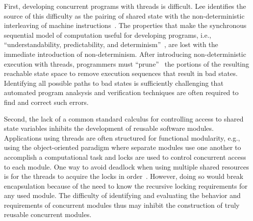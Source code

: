 First, developing concurrent programs with threads is difficult.
Lee identifies the source of this difficulty as the pairing of shared state with the non-deterministic interleaving of machine instructions~\cite{lee2006problem}.
The properties that make the synchronous sequential model of computation useful for developing programs, i.e., ``understandability, predictability, and determinism''~\cite{lee2006problem}, are lost with the immediate introduction of non-determinism.
After introducing non-deterministic execution with threads, programmers must ``prune''~\cite{lee2006problem} the portions of the resulting reachable state space to remove execution sequences that result in bad states.
Identifying all possible paths to bad states is sufficiently challenging that automated program analsysis and verification techniques are often required to find and correct such errors.


Second, the lack of a common standard calculus for controlling access to shared state variables inhibits the development of reusable software modules.
Applications using threads are often structured for functional modularity, e.g., using the object-oriented paradigm where separate modules use one another to accomplish a computational task and locks are used to control concurrent access to each module.
One way to avoid deadlock when using multiple shared resources is for the threads to acquire the locks in order~\cite{havender1968avoiding}.
However, doing so would break encapsulation because of the need to know the recursive locking requirements for any used module.
The difficulty of identifying and evaluating the behavior and requirements of concurrent modules thus may inhibit the construction of truly reusable concurrent modules.

